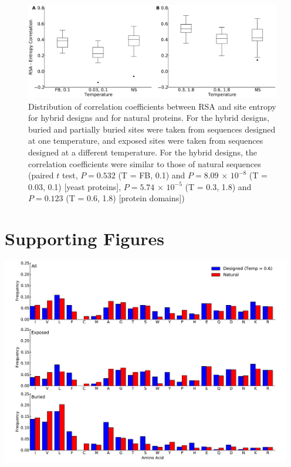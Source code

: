 \documentclass[12pt]{article}
\begin{document}
\begin{figure}[H]
\centerline{\includegraphics[width = 6in]{figures/Combo_Mixed_Temp_Correlation_Plot.pdf}}
\caption{Distribution of correlation coefficients between RSA and site entropy for hybrid designs and for natural proteins. {\color{red}For the hybrid designs, buried and partially buried sites were taken from sequences designed at one temperature, and exposed sites were taken from sequences designed at a different temperature. For the hybrid designs, the correlation coefficients were similar to those of natural sequences (paired $t$ test,  $P=0.532$ (T = FB, 0.1)  and  $P= 8.09 $ $\times$ $10^{-8}$ (T = 0.03, 0.1) [yeast proteins], $P= 5.74$  $\times$ $10^{-5}$ (T = 0.3, 1.8) and $P= 0.123$ (T = 0.6, 1.8)  [protein domains])}}
\label{Mixed_RSA_Entropy}
\end{figure}


\cleardoublepage

\section{Supporting Figures}

\centerline{\includegraphics[width = 5in]{figures/Noah_Freq_Combo_Plots_06.pdf}}
\end{document}
